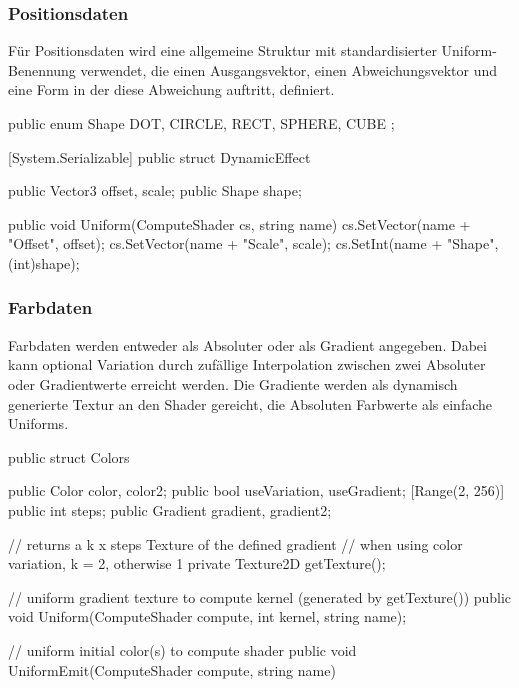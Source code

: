 \subsubsection{Positionsdaten}

Für Positionsdaten wird eine allgemeine Struktur mit standardisierter Uniform-Benennung verwendet, die einen Ausgangsvektor, einen Abweichungsvektor und eine Form in der diese Abweichung auftritt, definiert.

\begin{csh}[caption=DynamicEffect Struktur]
public enum Shape { DOT, CIRCLE, RECT, SPHERE, CUBE };

[System.Serializable]
public struct DynamicEffect
{
    public Vector3 offset, scale;
    public Shape shape;

    public void Uniform(ComputeShader cs, string name)
    {
        cs.SetVector(name + "Offset", offset);
        cs.SetVector(name + "Scale", scale);
        cs.SetInt(name + "Shape", (int)shape);
    }
}
\end{csh}



\subsubsection{Farbdaten}

Farbdaten werden entweder als Absoluter oder als Gradient angegeben. Dabei kann optional Variation durch zufällige Interpolation zwischen zwei Absoluter oder Gradientwerte erreicht werden. Die Gradiente werden als dynamisch generierte Textur an den Shader gereicht, die Absoluten Farbwerte als einfache Uniforms.

\begin{csh}
public struct Colors
{
    public Color color, color2;
    public bool useVariation, useGradient;
    [Range(2, 256)] public int steps;
    public Gradient gradient, gradient2;

    // returns a k x steps Texture of the defined gradient
    // when using color variation, k = 2, otherwise 1
    private Texture2D getTexture();

    // uniform gradient texture to compute kernel (generated by getTexture())
    public void Uniform(ComputeShader compute, int kernel, string name);

    // uniform initial color(s) to compute shader
    public void UniformEmit(ComputeShader compute, string name)
}
\end{csh}



